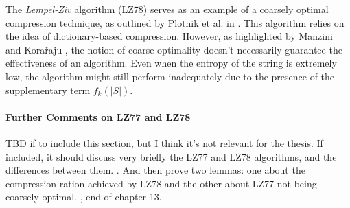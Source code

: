 \noindent The \emph{Lempel-Ziv} algorithm (LZ78) serves as an example of a coarsely optimal compression technique, as outlined by Plotnik et al. in \cite{plotnik1992upper}. This algorithm relies on the idea of dictionary-based compression. However, as highlighted by Manzini and Kora\v{r}aju \cite{kosaraju2000compression}, the notion of coarse optimality doesn't necessarily guarantee the effectiveness of an algorithm. Even when the entropy of the string is extremely low, the algorithm might still perform inadequately due to the presence of the supplementary term $f_k(|S|)$.

\paragraph{Further Comments on LZ77 and LZ78} TBD if to include this section, but I think it's not relevant for the thesis. If included, it should discuss very briefly the LZ77 and LZ78 algorithms, and the differences between them. \cite{ferragina2023pearls}. And then prove two lemmas: one about the compression ration achieved by LZ78 and the other about LZ77 not being coarsely optimal. \cite{ferragina2023pearls}, end of chapter 13.
